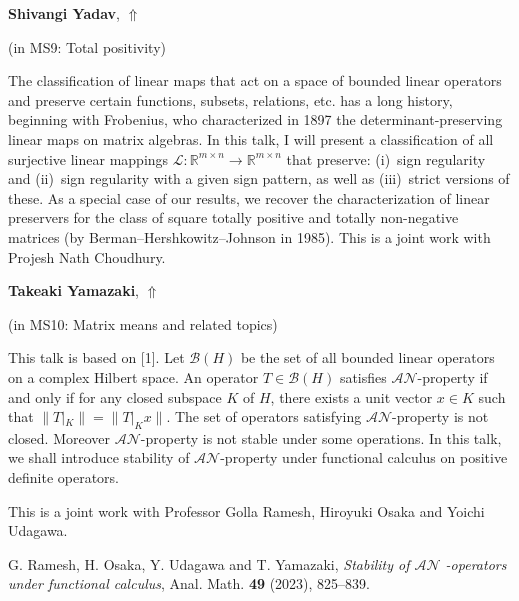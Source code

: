 \documentclass[ILAS2025-program.tex]{subfiles}
\begin{document}
\hypertarget{down0011}{}\begin{ilasabstract}
    
\textbf{Shivangi Yadav},  \hfill \hyperlink{up0011}{$\Uparrow$}
    
    
(in {\color{mstitle}MS9: Total positivity})
        
\mtskip
    The classification of linear maps that act on a space of bounded linear operators and preserve certain functions, subsets, relations, etc. has a long history, beginning with Frobenius, who characterized in 1897 the  determinant-preserving linear maps on matrix algebras. In this talk, I will present a classification of all surjective linear mappings $\mathcal{L}:\mathbb{R}^{m\times n}\to\mathbb{R}^{m\times n}$ that preserve: (i)~sign regularity and (ii)~sign regularity with a given sign pattern, as well as (iii)~strict versions of these. As a special case of our results, we recover the characterization of linear preservers for the class of square totally positive and totally non-negative matrices (by Berman--Hershkowitz--Johnson in 1985). This is a joint work with Projesh Nath Choudhury.

\end{ilasabstract}
    

\hypertarget{down0022}{}\begin{ilasabstract}
    
\textbf{Takeaki Yamazaki},  \hfill \hyperlink{up0022}{$\Uparrow$}
    
    
(in {\color{mstitle}MS10: Matrix means and related topics})
        
\mtskip
    This talk is based on [1].
Let $\mathcal{B}(H)$ be the set of all bounded linear operators on a complex Hilbert space. An operator $T\in \mathcal{B}(H)$ satisfies $\mathcal{AN}$-property if and only if for any closed subspace $K$ of $H$, there exists a unit vector $x\in K$ such that $\|T|_{K}\|=\|T|_{K}x\|$. The set of operators satisfying $\mathcal{AN}$-property is not closed. 
Moreover $\mathcal{AN}$-property is not stable under some operations.
In this talk, we shall introduce stability of $\mathcal{AN}$-property under functional calculus on positive definite operators.

This is a joint work with Professor Golla Ramesh, Hiroyuki Osaka and Yoichi Udagawa.

\noindent
[1] G. Ramesh, H. Osaka,
Y. Udagawa and T. Yamazaki, {\it Stability of  $\mathcal{AN}$ -operators under functional calculus},
Anal. Math. {\bf 49} (2023), 825--839.

\end{ilasabstract}
    
\end{document}
